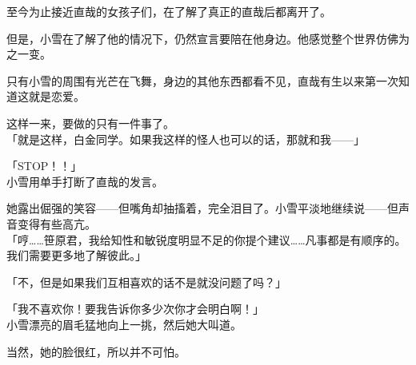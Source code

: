 至今为止接近直哉的女孩子们，在了解了真正的直哉后都离开了。

但是，小雪在了解了他的情况下，仍然宣言要陪在他身边。他感觉整个世界仿佛为之一变。

只有小雪的周围有光芒在飞舞，身边的其他东西都看不见，直哉有生以来第一次知道这就是恋爱。

这样一来，要做的只有一件事了。\\

「就是这样，白金同学。如果我这样的怪人也可以的话，那就和我——」

「STOP！！」\\

小雪用单手打断了直哉的发言。

她露出倔强的笑容——但嘴角却抽搐着，完全泪目了。小雪平淡地继续说——但声音变得有些高亢。\\

「哼……笹原君，我给知性和敏锐度明显不足的你提个建议……凡事都是有顺序的。我们需要更多地了解彼此。」

「不，但是如果我们互相喜欢的话不是就没问题了吗？」

「我不喜欢你！要我告诉你多少次你才会明白啊！」\\

小雪漂亮的眉毛猛地向上一挑，然后她大叫道。

当然，她的脸很红，所以并不可怕。\\

